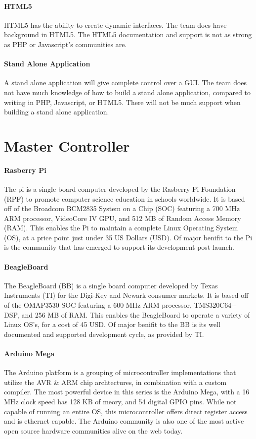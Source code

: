 \paragraph{HTML5} HTML5 has the ability to create dynamic interfaces.
The team does have background in HTML5.
The HTML5 documentation and support is not as strong as PHP or Javascript's communities are.

\paragraph{Stand Alone Application} A stand alone application will give complete control over a GUI.
The team does not have much knowledge of how to build a stand alone application, compared to writing in PHP, Javascript, or HTML5.
There will not be much support when building a stand alone application.

\section{Master Controller}
\paragraph{Rasberry Pi}
The \gls{pi} is a single board computer developed by the Rasberry Pi Foundation (RPF) to promote computer science education in schools worldwide.
It is based off of the Broadcom BCM2835 System on a Chip (SOC) featuring a 700 MHz ARM processor, VideoCore IV GPU, and 512 MB of Random Access Memory (RAM).
This enables the Pi to maintain a complete Linux Operating System (OS), at a price point just under 35 US Dollars (USD).
Of major beniﬁt to the Pi is the community that has emerged to support its development post-launch.

\paragraph{BeagleBoard}
The BeagleBoard (BB) is a single board computer developed by Texas Instruments (TI) for the Digi-Key and Newark consumer markets.
It is based off of the OMAP3530 SOC featuring a 600 MHz ARM processor, TMS320C64+ DSP, and 256 MB of RAM.
This enables the BeagleBoard to operate a variety of Linux OS’s, for a cost of 45 USD.
Of major beniﬁt to the BB is its well documented and supported development cycle, as provided by TI.

\paragraph{Arduino Mega}
The Arduino platform is a grouping of microcontroller implementations that utilize the AVR \& ARM chip archtectures, in combination with a custom compiler.
The most powerful device in this series is the Arduino Mega, with a 16 MHz clock speed has 128 KB of meory, and 54 digital GPIO pins.
While not capable of running an entire OS, this microcontroller offers direct register access and is ethernet capable.
The Arduino community is also one of the most active open source hardware communities alive on the web today.


